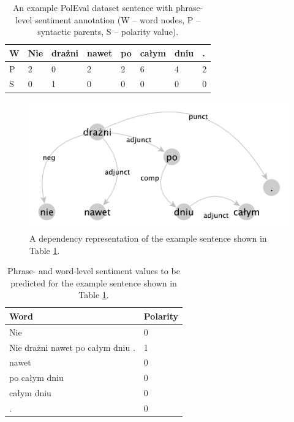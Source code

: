 \documentclass[10pt, a4paper]{article}
\begin{document}
\begin{table}[h]
 \begin{center}
\begin{tabular}{|l| l l l l l l l|}
      \hline
      W & Nie & drażni & nawet & po & całym & dniu & . \\
      \hline
      P & 2 & 0 & 2 & 2 & 6 & 4 & 2 \\
      \hline
      S & 0 & 1 & 0 & 0 & 0 & 0 & 0 \\
      \hline
\end{tabular}
\caption{An example PolEval dataset sentence with phrase-level sentiment annotation (W -- word nodes, P -- syntactic parents, S -- polarity value).}
\label{tab:nie_drazni_1}
 \end{center}
\end{table}



\begin{figure}
  \includegraphics[width=\linewidth]{imgs/nie_drazni.pdf}
  \caption{A dependency representation of the example sentence shown in Table \ref{tab:nie_drazni_1}.}
  \label{fig:dep_sent}
\end{figure}

\begin{table}[h]
 \begin{center}
\begin{tabular}{|l | l|}

\hline
 Word &	Polarity\\
      \hline
     Nie &	0\\
     \hline
Nie drażni nawet po całym dniu	 . & 1\\
\hline
nawet &	0\\
\hline
po całym dniu &	0\\
\hline
całym dniu &	0\\
\hline
.	& 0\\
      \hline
\end{tabular}
\caption{Phrase- and word-level sentiment values to be predicted for the example sentence shown in Table \ref{tab:nie_drazni_1}.}
\label{tab:nie_drazni_2}
 \end{center}
\end{table}
\end{document}
